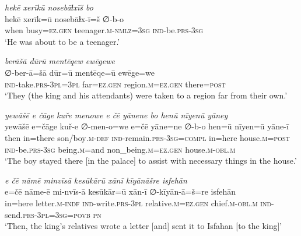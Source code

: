 \ea \label{KŠ.45}
\textit{hekē xerīkū nosebāɫxīš bo} \\ 
\gll hekē xerīk=ū nosebāɫx-ī=š ∅-b-o \\ 
 when busy\textsc{=ez.gen} teenager\textsc{.m}\textsc{-nmlz}\textsc{=3sg} \textsc{ind-}be\textsc{.prs}\textsc{-3sg} \\ 
\glt `He was about to be a teenager.'
\z 
 
\ea \label{KŠ.48}
\textit{berāšā dūrū mentēqew ewēgewe} \\ 
\gll ∅-ber-ā=šā dūr=ū mentēqe=ū ewēge=we \\ 
 \textsc{ind-}take\textsc{.prs}\textsc{-3pl}\textsc{=3pl} far\textsc{=ez.gen} region\textsc{.m}\textsc{=ez.gen} there\textsc{=\textsc{post}} \\ 
\glt `They (the king and his attendants) were taken to a region far from their own.'
\z 
 
\ea \label{KŠ.49}
\textit{yewāšē e čāge kuře menowe e čē yānene bo henū nīyenū yāney} \\ 
\gll yewāšē e=čāge kuř-e ∅-men-o=we e=čē yāne=ne ∅-b-o hen=ū nīyen=ū yāne-ī \\ 
 then in=there son/boy\textsc{.m}\textsc{-def} \textsc{ind-}remain\textsc{.prs}\textsc{-3sg}\textsc{=compl} in=here house\textsc{.m}\textsc{=\textsc{post}} \textsc{ind-}be\textsc{.prs}\textsc{-3sg} being\textsc{.m}=and non\_being\textsc{.m}\textsc{=ez.gen} house\textsc{.m}\textsc{-obl}\textsc{.m} \\ 
\glt `The boy stayed there [in the palace] to assist with necessary things in the house.'
\z 
 
\ea \label{KŠ.50}
\textit{e čē nāmē minvīsā kesūkārū xānī kīyānāšre isfehān} \\ 
\gll e=čē nāme-ē mi-nvīs-ā kesūkār=ū xān-ī ∅-kīyān-ā=š=re isfehān \\ 
 in=here letter\textsc{.m}\textsc{-indf} \textsc{ind-}write\textsc{.prs}\textsc{-3pl} relative\textsc{.m}\textsc{=ez.gen} chief\textsc{.m}\textsc{-obl}\textsc{.m} \textsc{ind-}send\textsc{.prs}\textsc{-3pl}\textsc{=3sg}\textsc{=\textsc{povb}} \textsc{pn} \\ 
\glt `Then, the king’s relatives wrote a letter [and] sent it to Isfahan [to the king]'
\z 
 
